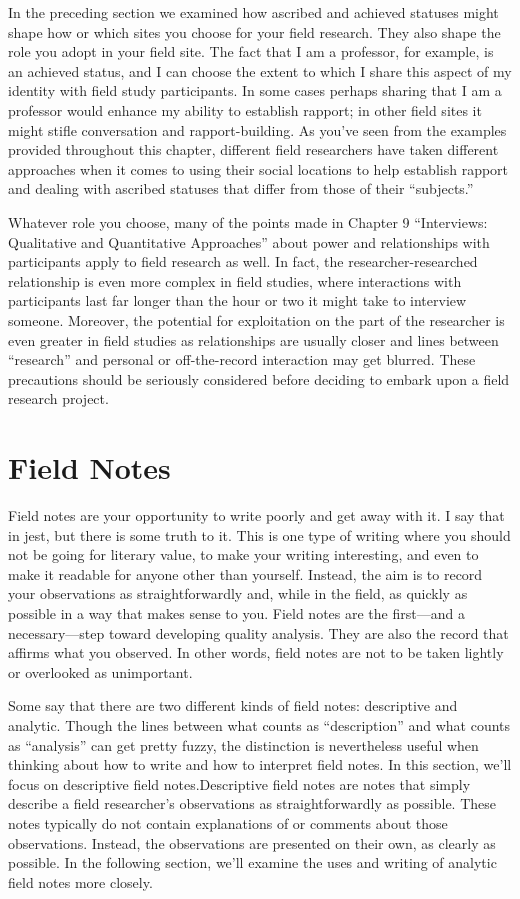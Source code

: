 In the preceding section we examined how ascribed and achieved statuses might shape how or which sites you choose for your field research. They also shape the role you adopt in your field site. The fact that I am a professor, for example, is an achieved status, and I can choose the extent to which I share this aspect of my identity with field study participants. In some cases perhaps sharing that I am a professor would enhance my ability to establish rapport; in other field sites it might stifle conversation and rapport-building. As you’ve seen from the examples provided throughout this chapter, different field researchers have taken different approaches when it comes to using their social locations to help establish rapport and dealing with ascribed statuses that differ from those of their ``subjects.''

Whatever role you choose, many of the points made in Chapter 9 ``Interviews: Qualitative and Quantitative Approaches'' about power and relationships with participants apply to field research as well. In fact, the researcher-researched relationship is even more complex in field studies, where interactions with participants last far longer than the hour or two it might take to interview someone. Moreover, the potential for exploitation on the part of the researcher is even greater in field studies as relationships are usually closer and lines between ``research'' and personal or off-the-record interaction may get blurred. These precautions should be seriously considered before deciding to embark upon a field research project.


\section{Field Notes}


Field notes are your opportunity to write poorly and get away with it. I say that in jest, but there is some truth to it. This is one type of writing where you should not be going for literary value, to make your writing interesting, and even to make it readable for anyone other than yourself. Instead, the aim is to record your observations as straightforwardly and, while in the field, as quickly as possible in a way that makes sense to you. Field notes are the first—and a necessary—step toward developing quality analysis. They are also the record that affirms what you observed. In other words, field notes are not to be taken lightly or overlooked as unimportant.

Some say that there are two different kinds of field notes: descriptive and analytic. Though the lines between what counts as ``description'' and what counts as ``analysis'' can get pretty fuzzy, the distinction is nevertheless useful when thinking about how to write and how to interpret field notes. In this section, we’ll focus on descriptive field notes.Descriptive field notes are notes that simply describe a field researcher’s observations as straightforwardly as possible. These notes typically do not contain explanations of or comments about those observations. Instead, the observations are presented on their own, as clearly as possible. In the following section, we’ll examine the uses and writing of analytic field notes more closely.

